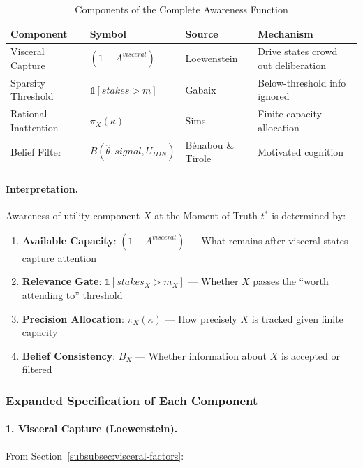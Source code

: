 \begin{table}[htbp]
\centering
\caption{Components of the Complete Awareness Function}
\label{tab:awareness-components}
\renewcommand{\arraystretch}{1.5}
\begin{tabular}{@{}llll@{}}
\toprule
\textbf{Component} & \textbf{Symbol} & \textbf{Source} & \textbf{Mechanism} \\
\midrule
Visceral Capture & $(1 - A^{visceral})$ & Loewenstein & Drive states crowd out deliberation \\
Sparsity Threshold & $\mathbb{1}[stakes > m]$ & Gabaix & Below-threshold info ignored \\
Rational Inattention & $\pi_X(\kappa)$ & Sims & Finite capacity allocation \\
Belief Filter & $B(\hat{\theta}, signal, U_{IDN})$ & Bénabou \& Tirole & Motivated cognition \\
\bottomrule
\end{tabular}
\end{table}

\paragraph{Interpretation.}
Awareness of utility component $X$ at the Moment of Truth $t^*$ is determined by:

\begin{enumerate}
\item \textbf{Available Capacity}: $(1 - A^{visceral})$ — What remains after visceral states capture attention
\item \textbf{Relevance Gate}: $\mathbb{1}[stakes_X > m_X]$ — Whether $X$ passes the ``worth attending to'' threshold
\item \textbf{Precision Allocation}: $\pi_X(\kappa)$ — How precisely $X$ is tracked given finite capacity
\item \textbf{Belief Consistency}: $B_X$ — Whether information about $X$ is accepted or filtered
\end{enumerate}

\subsubsection{Expanded Specification of Each Component}
\label{subsubsec:expanded-specification}

\paragraph{1. Visceral Capture (Loewenstein).}
From Section~\ref{subsubsec:visceral-factors}:

